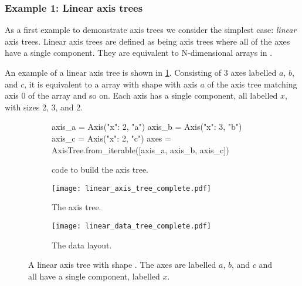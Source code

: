 \documentclass[thesis]{subfiles}
\begin{document}
\subsubsection{Example 1: Linear axis trees}

As a first example to demonstrate axis trees we consider the simplest case: \emph{linear} axis trees.
Linear axis trees are defined as being axis trees where all of the axes have a single component.
They are equivalent to N-dimensional arrays in \numpy{}.

An example of a linear axis tree is shown in \cref{fig:linear_axis_tree}.
Consisting of 3 axes labelled $a$, $b$, and $c$, it is equivalent to a \numpy{} array with shape  with axis $a$ of the axis tree matching axis 0 of the \numpy{} array and so on.
Each axis has a single component, all labelled $x$, with sizes 2, 3, and 2.

\begin{figure}
  \centering
  \begin{subfigure}{.9\textwidth}
    \begin{pyalg2}
      axis_a = Axis({"x": 2}, "a")
      axis_b = Axis({"x": 3}, "b")
      axis_c = Axis({"x": 2}, "c")
      axes = AxisTree.from_iterable([axis_a, axis_b, axis_c])
    \end{pyalg2}
    \caption{ code to build the axis tree.}
  \end{subfigure}

  \vspace{1em}

  \begin{subfigure}[t]{.3\textwidth}
    \centering
    \texttt{[image: linear\_axis\_tree\_complete.pdf]}
    \caption{The axis tree.}
  \end{subfigure}
  \begin{subfigure}[t]{.3\textwidth}
    \centering
    \texttt{[image: linear\_data\_tree\_complete.pdf]}
    \caption{The data layout.}
  \end{subfigure}
  \caption{
    A linear axis tree with shape .
    The axes are labelled $a$, $b$, and $c$ and all have a single component, labelled $x$.
  }
  \label{fig:linear_axis_tree}
\end{figure}
\end{document}
